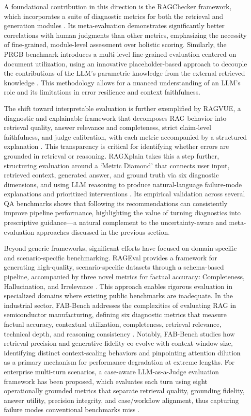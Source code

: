 \documentclass[11pt]{article}
\begin{document}
A foundational contribution in this direction is the RAGChecker framework, which incorporates a suite of diagnostic metrics for both the retrieval and generation modules \cite{ref407}. Its meta-evaluation demonstrates significantly better correlations with human judgments than other metrics, emphasizing the necessity of fine-grained, module-level assessment over holistic scoring. Similarly, the PRGB benchmark introduces a multi-level fine-grained evaluation centered on document utilization, using an innovative placeholder-based approach to decouple the contributions of the LLM's parametric knowledge from the external retrieved knowledge \cite{ref416}. This methodology allows for a nuanced understanding of an LLM's role and its limitations in error resilience and context faithfulness.

The shift toward interpretable evaluation is further exemplified by RAGVUE, a diagnostic and explainable framework that decomposes RAG behavior into retrieval quality, answer relevance and completeness, strict claim-level faithfulness, and judge calibration, with each metric accompanied by a structured explanation \cite{ref417}. This transparency is critical for identifying whether errors are grounded in retrieval or reasoning. RAGXplain takes this a step further, structuring evaluation around a `Metric Diamond' that connects user input, retrieved context, generated answer, and ground truth via six diagnostic dimensions, and using LLM reasoning to produce natural-language failure-mode explanations and prioritized interventions \cite{ref415}. Its empirical validation across several QA benchmarks shows that following its recommendations can consistently improve pipeline performance, highlighting the value of turning diagnostics into prescriptive guidance---a natural complement to the uncertainty-aware and meta-evaluation approaches discussed in the previous section.

Beyond generic frameworks, significant efforts have focused on domain-specific and scenario-specific benchmarking. RAGEval provides a framework for generating high-quality, scenario-specific datasets through a schema-based pipeline, accompanied by three novel metrics for factual accuracy: Completeness, Hallucination, and Irrelevance \cite{ref418}. This approach enables rigorous evaluation in specialized domains where existing public benchmarks are inadequate. In the industrial sector, FAB-Bench addresses the complexities of evaluating RAG in semiconductor manufacturing, defining six diagnostic metrics that measure factual accuracy, contextual utilization, completeness, retrieval relevance, technical depth, and reasoning consistency \cite{ref419}. Notably, FAB-Bench studies how retrieval precision and generative fidelity co-evolve with context window size, identifying distinct context-scaling behaviors and pinpointing attention dilution as a primary mechanism for performance degradation at extreme lengths. For enterprise multi-turn scenarios, a case-aware LLM-as-a-Judge evaluation framework has been proposed, which evaluates each turn using eight operationally grounded metrics that separate retrieval quality, grounding fidelity, answer utility, precision integrity, and case/workflow alignment, thus capturing failure modes conventional benchmarks miss \cite{ref420}.
\end{document}
